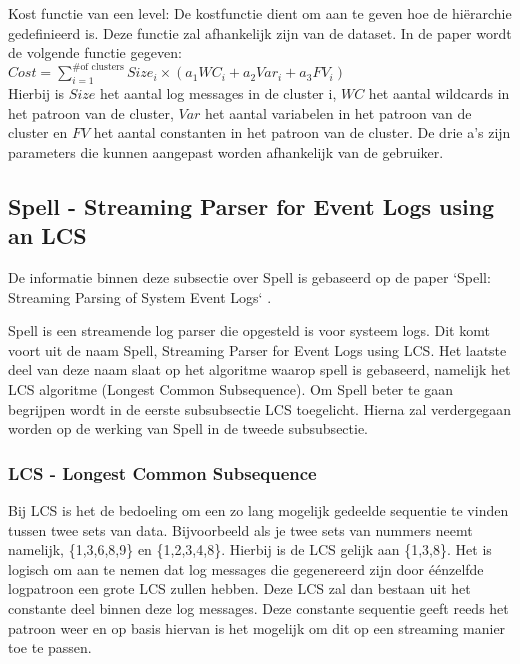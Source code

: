 \begin{itemize}
    \subitem Kost functie van een level: De kostfunctie dient om aan te geven hoe de hiërarchie gedefinieerd is. Deze functie zal afhankelijk zijn van de dataset. In de paper wordt de volgende functie gegeven:\\
    \(Cost = \sum_{i=1}^{\text{\# of clusters}} Size_{i} \times (a_{1}WC_{i} + a_{2}Var_{i} + a_{3}FV_{i})\)\\
    
    Hierbij is $Size$ het aantal log messages in de cluster i, $WC$ het aantal wildcards in het patroon van de cluster, $Var$ het aantal variabelen in het patroon van de cluster en $FV$ het aantal constanten in het patroon van de cluster. De drie a's zijn parameters die kunnen aangepast worden afhankelijk van de gebruiker.
\end{itemize}

\subsection{Spell - Streaming Parser for Event Logs using an LCS}
De informatie binnen deze subsectie over Spell is gebaseerd op de paper `Spell: Streaming Parsing of System Event Logs` \autocite{du2016spell}.

Spell is een streamende log parser die opgesteld is voor systeem logs. Dit komt voort uit de naam Spell, Streaming Parser for Event Logs using LCS. Het laatste deel van deze naam slaat op het algoritme waarop spell is gebaseerd, namelijk het LCS algoritme (Longest Common Subsequence). Om Spell beter te gaan begrijpen wordt in de eerste subsubsectie LCS toegelicht. Hierna zal verdergegaan worden op de werking van Spell in de tweede subsubsectie.

\subsubsection{LCS - Longest Common Subsequence}
Bij LCS is het de bedoeling om een zo lang mogelijk gedeelde sequentie te vinden tussen twee sets van data. Bijvoorbeeld als je twee sets van nummers neemt namelijk, \{1,3,6,8,9\} en \{1,2,3,4,8\}. Hierbij is de LCS gelijk aan \{1,3,8\}. Het is logisch om aan te nemen dat log messages die gegenereerd zijn door éénzelfde logpatroon een grote LCS zullen hebben. Deze LCS zal dan bestaan uit het constante deel binnen deze log messages. Deze constante sequentie geeft reeds het patroon weer en op basis hiervan is het mogelijk om dit op een streaming manier toe te passen.

